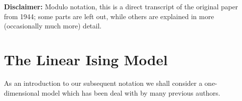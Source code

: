 \documentclass[english, parskip=full]{scrartcl}
\title{\Title}
\author{\Author}
\date{\today}
\begin{document}
\maketitle

\begin{center}
\textbf{Disclaimer:} Modulo notation, this is a direct transcript of the original paper from 1944; some parts are left out, while others are explained in more (occasionally much more) detail.
\end{center}
\section{The Linear Ising Model}
As an introduction to our subsequent notation we shall consider a one-dimensional model which has been deal with by many previous authors.
\end{document}
